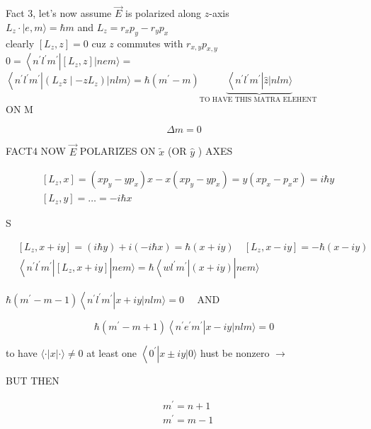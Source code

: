 \documentclass[10pt]{article}
\begin{document}
Fact 3, let's now assume $\vec{E}$ is polarized along $z$-axis\\
$L_{z} \cdot|e, m\rangle=\hbar m$ and $L_{z}=r_{x} p_{y}-r_{y} p_{x}$\\
clearly $\left[L_{z}, z\right]=0$ cuz $z$ commutes with $r_{x, y} p_{x, y}$\\
$0=\left\langle n^{\prime} l^{\prime} m^{\prime}\right|\left[L_{z}, z\right]|n e m\rangle=$\\
$\left\langle n^{\prime} l^{\prime} m^{\prime}\right|\left(L_{z} z \mid-z L_{z}\right)|n l m\rangle=\hbar\left(m^{\prime}-m\right) \underbrace{\left\langle n^{\prime} l^{\prime} m^{\prime}\right| \hat{z}|n l m\rangle}_{\text {TO HAVE THIS MATRA ELEHENT }}$\\
ON M

$$
\Delta m=0
$$

FACT4 NOW $\vec{E}$ POLARIZES ON $\tilde{x}$ (OR $\hat{y}$ ) AXES

$$
\begin{aligned}
& {\left[L_{z}, x\right]=\left(x p_{y}-y p_{x}\right) x-x\left(x p_{y}-y p_{x}\right)=y\left(x p_{x}-p_{x} x\right)=i \hbar y} \\
& {\left[L_{z}, y\right]=\ldots=-i \hbar x}
\end{aligned}
$$

S

$$
\begin{aligned}
& {\left[L_{z}, x+i y\right]=(i \hbar y)+i(-i \hbar x)=\hbar(x+i y) \quad\left[L_{z}, x-i y\right]=-\hbar(x-i y)} \\
& \left\langle n^{\prime} l^{\prime} m^{\prime}\right|\left[L_{z}, x+i y\right]|n e m\rangle=\hbar\left\langle w l^{\prime} m^{\prime}\right|(x+i y)|n e m\rangle
\end{aligned}
$$

$\hbar\left(m^{\prime}-m-1\right)\left\langle n^{\prime} l^{\prime} m^{\prime}\right| x+i y|n l m\rangle=0 \quad$ AND

$$
\hbar\left(m^{\prime}-m+1\right)\left\langle n^{\prime} e^{\prime} m^{\prime}\right| x-i y|n l m\rangle=0
$$

to have $\langle\cdot| x|\cdot\rangle \neq 0$ at least one $\left\langle 0^{\prime}\right| x \pm i y|0\rangle$ hust be nonzero $\rightarrow$

BUT THEN

$$
\begin{aligned}
& m^{\prime}=n+1 \\
& m^{\prime}=m-1
\end{aligned}
$$
\end{document}
